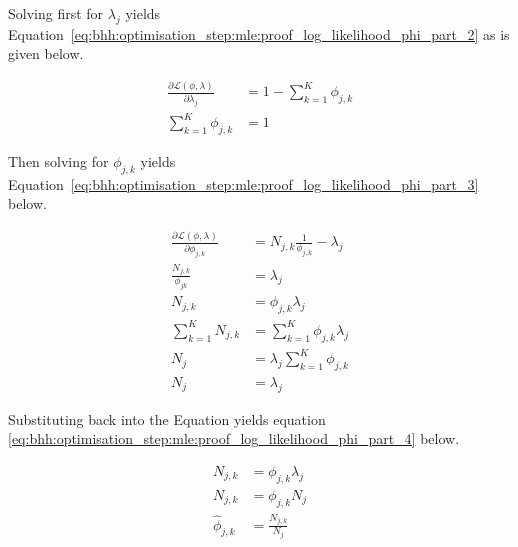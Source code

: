 Solving first for $\lambda_{j}$ yields Equation~\eqref{eq:bhh:optimisation_step:mle:proof_log_likelihood_phi_part_2} as is given below.

\begin{equation}
      \label{eq:bhh:optimisation_step:mle:proof_log_likelihood_phi_part_2}
      \begin{split}
            \frac{\partial \mathcal{L}(\phi, \lambda)}{\partial \lambda_{j}} &= 1 - \sum_{k=1}^{K} \phi_{j,k}  \\
            \sum_{k=1}^{K} \phi_{j,k}  &= 1
      \end{split}
\end{equation}

Then solving for $\phi_{j,k}$ yields Equation~\eqref{eq:bhh:optimisation_step:mle:proof_log_likelihood_phi_part_3} below.

\begin{equation}
      \label{eq:bhh:optimisation_step:mle:proof_log_likelihood_phi_part_3}
      \begin{split}
            \frac{\partial \mathcal{L}(\phi, \lambda)}{\partial \phi_{j,k}} &= N_{j,k} \frac{1}{\phi_{j,k}}  - \lambda_{j} \\
            \frac{N_{j,k}}{\phi_{jk}} &= \lambda_{j} \\
            N_{j,k} &= \phi_{j,k} \lambda_{j} \\
            \sum_{k=1}^{K} N_{j,k} &= \sum_{k=1}^{K} \phi_{j,k} \lambda_{j} \\
            N_{j} &= \lambda_{j} \sum_{k=1}^{K} \phi_{j,k} \\
            N_{j} &= \lambda_{j}
      \end{split}
\end{equation}

Substituting back into the Equation yields equation \ref{eq:bhh:optimisation_step:mle:proof_log_likelihood_phi_part_4} below.

\begin{equation}
      \label{eq:bhh:optimisation_step:mle:proof_log_likelihood_phi_part_4}
      \begin{split}
            N_{j,k} &= \phi_{j,k} \lambda_{j} \\
            N_{j,k} &= \phi_{j,k} N_{j} \\
            \hat{\phi}_{j,k} &= \frac{N_{j,k}}{N_{j}}\\
      \end{split}
\end{equation}

